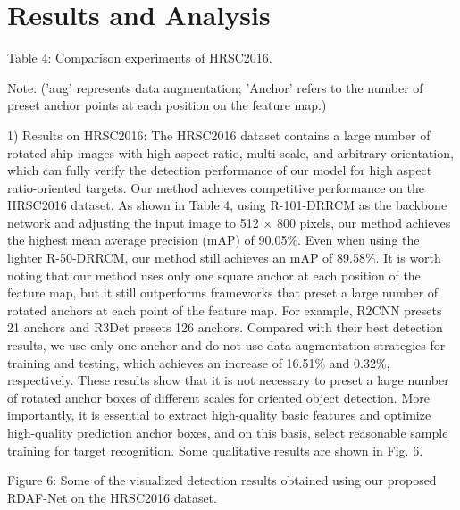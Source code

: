 \documentclass[10pt,twocolumn,final]{article}
\begin{document}
\section{ Results and Analysis }

Table 4: Comparison experiments of HRSC2016.

Note: ('aug' represents data augmentation; 'Anchor' refers to the number of preset anchor points at each position on the feature map.)

1) Results on HRSC2016: The HRSC2016 dataset contains a large number of rotated ship images with high aspect ratio, multi-scale, and arbitrary orientation, which can fully verify the detection performance of our model for high aspect ratio-oriented targets. Our method achieves competitive performance on the HRSC2016 dataset. As shown in Table 4, using R-101-DRRCM as the backbone network and adjusting the input image to 512 × 800 pixels, our method achieves the highest mean average precision (mAP) of 90.05\%. Even when using the lighter R-50-DRRCM, our method still achieves an mAP of 89.58\%. It is worth noting that our method uses only one square anchor at each position of the feature map, but it still outperforms frameworks that preset a large number of rotated anchors at each point of the feature map. For example, R2CNN presets 21 anchors and R3Det presets 126 anchors. Compared with their best detection results, we use only one anchor and do not use data augmentation strategies for training and testing, which achieves an increase of 16.51\% and 0.32\%, respectively. These results show that it is not necessary to preset a large number of rotated anchor boxes of different scales for oriented object detection. More importantly, it is essential to extract high-quality basic features and optimize high-quality prediction anchor boxes, and on this basis, select reasonable sample training for target recognition. Some qualitative results are shown in Fig. 6.

Figure 6: Some of the visualized detection results obtained using our proposed RDAF-Net on the HRSC2016 dataset.
\end{document}

